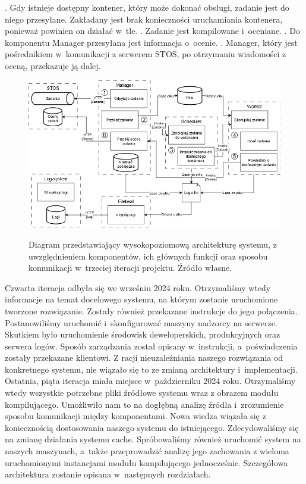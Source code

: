 \newline {}. Gdy istnieje dostępny kontener, który może dokonać obsługi, zadanie jest do niego przesyłane. Zakładany jest brak konieczności uruchamiania kontenera, ponieważ powinien on działać w~tle.
\newline {}. Zadanie jest kompilowane i~oceniane.
\newline {}. Do komponentu Manager przesyłana jest informacja o~ocenie.
\newline {}. Manager, który jest pośrednikiem w~komunikacji z serwerem STOS, po otrzymaniu wiadomości z oceną, przekazuje ją dalej.
\begin{figure}[!h]
	\begin{center}
		\resizebox{1.0\textwidth}{!} {
			\includegraphics{img/1/i3_arch.png}
		}
		\caption[Architektura po trzeciej iteracji]{Diagram przedstawiający wysokopoziomową architekturę systemu, z uwzględnieniem komponentów, ich głównych funkcji oraz sposobu komunikacji w~trzeciej iteracji projektu. Źródło własne.}
	\end{center}
\end{figure}
\newline \indent Czwarta iteracja odbyła się we wrześniu 2024 roku. Otrzymaliśmy wtedy informacje na temat docelowego systemu, na którym zostanie uruchomione tworzone rozwiązanie. Zostały również przekazane instrukcje do jego połączenia. Postanowiliśmy uruchomić i~skonfigurować maszyny nadzorcy na serwerze. Skutkiem było uruchomienie środowisk deweloperskich, produkcyjnych oraz serwera logów. Sposób zarządzania został opisany w~instrukcji, a~poświadczenia zostały przekazane klientowi. Z racji nieuzależniania naszego rozwiązania od konkretnego systemu, nie wiązało się to ze zmianą architektury i~implementacji. 
\newline \indent Ostatnia, piąta iteracja miała miejsce w~październiku 2024 roku. Otrzymaliśmy wtedy wszystkie potrzebne pliki źródłowe systemu wraz z obrazem modułu kompilującego. Umożliwiło nam to na dogłębną analizę źródła i~zrozumienie sposobu komunikacji między komponentami. Nowa wiedza wiązała się z koniecznością dostosowania naszego systemu do istniejącego. Zdecydowaliśmy się na zmianę działania systemu cache. Spróbowaliśmy również uruchomić system na naszych maszynach, a~także przeprowadzić analizę jego zachowania z wieloma uruchomionymi instancjami modułu kompilującego jednocześnie. Szczegółowa architektura zostanie opisana w~następnych rozdziałach.